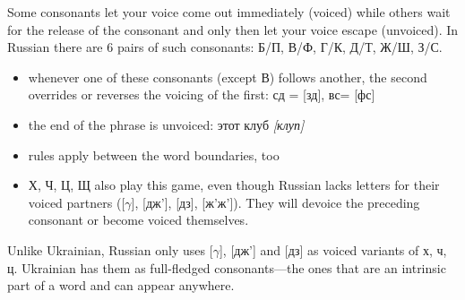 Some consonants let your voice come out immediately (voiced) while
others wait for the release of the consonant and only then let your
voice escape (unvoiced). In Russian there are 6 pairs of such
consonants: Б/П, В/Ф, Г/К, Д/Т, Ж/Ш, З/С.

\begin{itemize}
\tightlist
\item
  whenever one of these consonants (except В) follows another, the
  second overrides or reverses the voicing of the first: сд = {[}зд{]},
  вс= {[}фс{]}
\item
  the end of the phrase is unvoiced: этот клуб \emph{{[}клуп{]}}
\item
  rules apply between the word boundaries, too
\item
  Х, Ч, Ц, Щ also play this game, even though Russian lacks letters for
  their voiced partners ({[}$ \gamma${]}, {[}дж'{]}, {[}дз{]}, {[}ж'ж'{]}). They
  will devoice the preceding consonant or become voiced themselves.
\end{itemize}

Unlike Ukrainian, Russian only uses {[}$ \gamma${]}, {[}дж'{]} and {[}дз{]} as
voiced variants of х, ч, ц. Ukrainian has them as full-fledged
consonants---the ones that are an intrinsic part of a word and can
appear anywhere.
